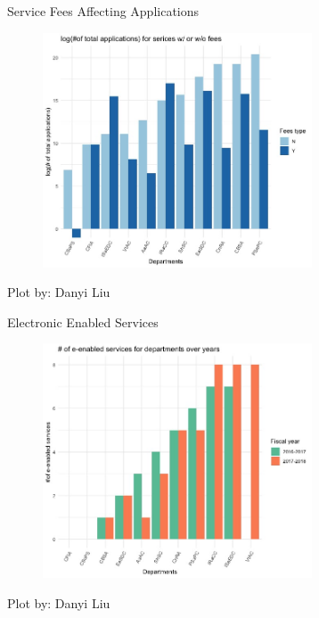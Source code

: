 \documentclass[compress]{beamer}
\begin{document}
\begin{frame}{Service Fees Affecting Applications}
\begin{figure}[htp]
    \centering
    \includegraphics[width=8cm]{3.jpeg}
\end{figure}
\hfill\tiny{Plot by: Danyi Liu}
\end{frame}


\begin{frame}{Electronic Enabled Services}
\begin{figure}[htp]
    \centering
    \includegraphics[width=8cm]{4.jpeg}
\end{figure}
\hfill\tiny{Plot by: Danyi Liu}
\end{frame}


\end{document}
